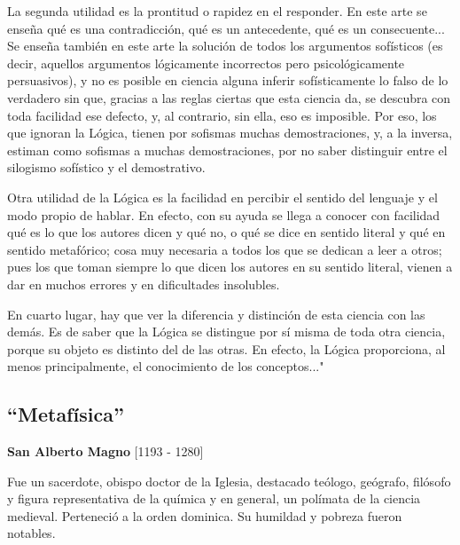 \documentclass{article}
\begin{document}
    La segunda utilidad es la prontitud o rapidez en el responder. En este arte se enseña qué es una contradicción, qué es un antecedente, qué es un consecuente... Se enseña también en este arte la solución de todos los argumentos sofísticos (es decir, aquellos argumentos lógicamente incorrectos pero psicológicamente persuasivos), y no es posible en ciencia alguna inferir sofísticamente lo falso de lo verdadero sin que, gracias a las reglas ciertas que esta ciencia da, se descubra con toda facilidad ese defecto, y, al contrario, sin ella, eso es imposible. Por eso, los que ignoran la Lógica, tienen por sofismas muchas demostraciones, y, a la inversa, estiman como sofismas a muchas demostraciones, por no saber distinguir entre el silogismo sofístico y el demostrativo. \par
    
    Otra utilidad de la Lógica es la facilidad en percibir el sentido del lenguaje y el modo propio de hablar. En efecto, con su ayuda se llega a conocer con facilidad qué es lo que los autores dicen y qué no, o qué se dice en sentido literal y qué en sentido metafórico; cosa muy necesaria a todos los que se dedican a leer a otros; pues los que toman siempre lo que dicen los autores en su sentido literal, vienen a dar en muchos errores y en dificultades insolubles. \par
    
    En cuarto lugar, hay que ver la diferencia y distinción de esta ciencia con las demás. Es de saber que la Lógica se distingue por sí misma de toda otra ciencia, porque su objeto es distinto del de las otras. En efecto, la Lógica proporciona, al menos principalmente, el conocimiento de los conceptos..." \par
    

\newpage

\subsection{``Metafísica''}
    
\begin{center}
    \large{\textbf{San Alberto Magno} [1193 - 1280]}
\end{center}
    Fue un sacerdote, obispo doctor de la Iglesia, destacado teólogo, geógrafo, filósofo y figura representativa de la química y en general, un polímata de la ciencia medieval. Perteneció a la orden dominica. Su humildad y pobreza fueron notables. \par
    
\end{document}
